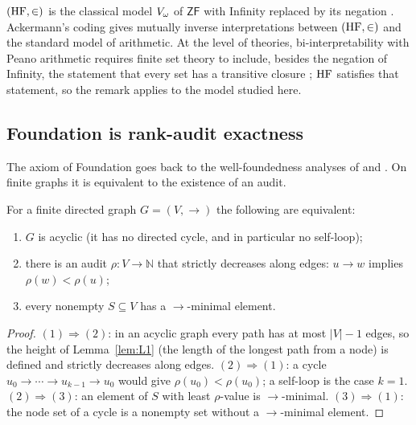 \begin{remark}[Arithmetic]\label{rem:ackermann}
$(\mathrm{HF},\in)$ is the classical model $V_{\omega}$ of $\mathsf{ZF}$ with Infinity replaced by its
negation \citep{Kunen2011}. Ackermann's coding \citep{Ackermann1937} gives mutually
inverse interpretations between $(\mathrm{HF},\in)$ and the standard model of arithmetic. At the level of
theories, bi-interpretability with Peano arithmetic requires finite set theory to include, besides
the negation of Infinity, the statement that every set has a transitive closure
\citep{KayeWong2007}; $\mathrm{HF}$ satisfies that statement, so the remark applies to the model
studied here.
\end{remark}

\subsection{Foundation is rank-audit exactness}\label{ssec:foundation}

The axiom of Foundation goes back to the well-foundedness analyses of \citet{Mirimanoff1917} and
\citet{VonNeumann1928}. On finite graphs it is equivalent to the existence of an audit.

\begin{theorem}\label{thm:tfae}
For a finite directed graph $G=(V,\to)$ the following are equivalent:
\begin{enumerate}\itemsep0pt
  \item $G$ is acyclic (it has no directed cycle, and in particular no self-loop);
  \item there is an audit $\rho\colon V\to\mathbb N$ that strictly decreases along edges:
  $u\to w$ implies $\rho(w)<\rho(u)$;
  \item every nonempty $S\subseteq V$ has a $\to$-minimal element.
\end{enumerate}
\end{theorem}

\begin{proof}
$(1)\Rightarrow(2)$: in an acyclic graph every path has at most $|V|-1$ edges, so the height
of Lemma~\ref{lem:L1} (the length of the longest path from a node) is defined and strictly
decreases along edges. $(2)\Rightarrow(1)$: a cycle $u_0\to\cdots\to u_{k-1}\to u_0$ would give
$\rho(u_0)<\rho(u_0)$; a self-loop is the case $k=1$. $(2)\Rightarrow(3)$: an element of $S$
with least $\rho$-value is $\to$-minimal. $(3)\Rightarrow(1)$: the node set of a cycle is a
nonempty set without a $\to$-minimal element.
\end{proof}

